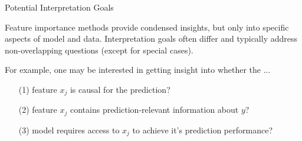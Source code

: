 \documentclass[10pt,compress,t,notes=noshow, xcolor=table]{beamer}
\begin{document}
\begin{frame}{Potential Interpretation Goals}

Feature importance methods provide condensed insights, but only into specific aspects of model and data. Interpretation goals often differ and typically address non-overlapping questions (except for special cases).

\lz 

For example, one may be interested in getting insight into whether the ...

\begin{enumerate}
    \item[(1)] feature $x_j$ is causal for the prediction?
    \item[(2)] feature $x_j$ contains prediction-relevant information about $y$?
    \item[(3)] model requires access to $x_j$ to achieve it's prediction performance?
\end{enumerate}
\end{frame}
\end{document}
